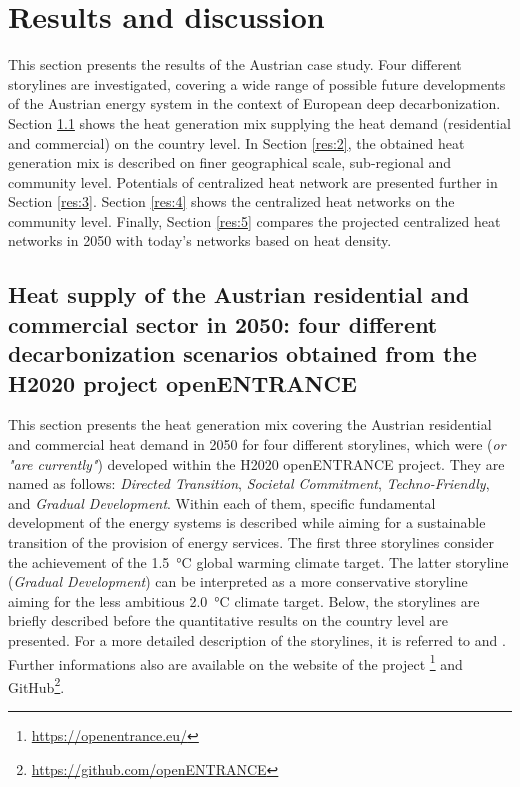 \section{Results and discussion}\label{results}
This section presents the results of the Austrian case study. Four different storylines are investigated, covering a wide range of possible future developments of the Austrian energy system in the context of European deep decarbonization. Section \ref{res:1} shows the heat generation mix supplying the heat demand (residential and commercial) on the country level. In Section \ref{res:2}, the obtained heat generation mix is described on finer geographical scale, sub-regional and community level. Potentials of centralized heat network are presented further in Section \ref{res:3}. Section \ref{res:4} shows the centralized heat networks on the community level. Finally, Section \ref{res:5} compares the projected centralized heat networks in 2050 with today's networks based on heat density.

\subsection{Heat supply of the Austrian residential and commercial sector in 2050: four different decarbonization scenarios obtained from the H2020 project openENTRANCE}\label{res:1}
This section presents the heat generation mix covering the Austrian residential and commercial heat demand in 2050 for four different storylines, which were (\textit{or "are currently"}) developed within the H2020 openENTRANCE project. They are named as follows: \textit{Directed Transition}, \textit{Societal Commitment}, \textit{Techno-Friendly}, and \textit{Gradual Development}. Within each of them, specific fundamental development of the energy systems is described while aiming for a sustainable transition of the provision of energy services. The first three storylines consider the achievement of the \SI{1.5}{\degreeCelsius} global warming climate target. The latter storyline (\textit{Gradual Development}) can be interpreted as a more conservative storyline aiming for the less ambitious \SI{2.0}{\degreeCelsius} climate target. Below, the storylines are briefly described before the quantitative results on the country level are presented. For a more detailed description of the storylines, it is referred to \cite{auer2020quantitative} and \cite{auer2020development}. Further informations also are available on the website of the project \footnote{\url{https://openentrance.eu/}} and GitHub\footnote{\url{https://github.com/openENTRANCE}}.\newline

